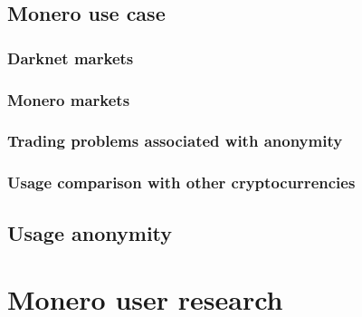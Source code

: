 \documentclass[
  printed, %
  table,   %
  nolof,     %
  nolot,     %
           oneside, color
]{fithesis3}
\begin{document}

\section{Monero use case}

\subsection{Darknet markets}

\subsection{Monero markets}

\subsection{Trading problems associated with anonymity}

\subsection{Usage comparison with other cryptocurrencies}


\section{Usage anonymity}

\chapter{Monero user research}
\end{document}
